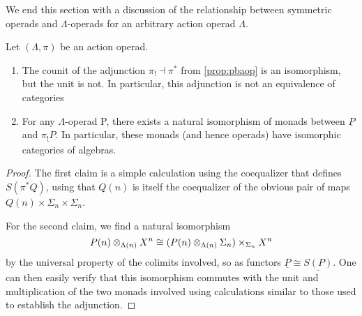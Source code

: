 We end this section with a discussion of the relationship between symmetric operads and $\Lambda$-operads for an arbitrary action operad $\Lambda$.

\begin{thm}\label{thm_sym}
Let $(\Lambda, \pi)$ be an action operad.
\begin{enumerate}
\item The counit of the adjunction $\pi_{!} \dashv \pi^*$ from \cref{prop:pbaop} is an isomorphism, but the unit is not. In particular, this adjunction is not an equivalence of categories
\item For any $\Lambda$-operad P, there exists a natural isomorphism of monads between $\underline{P}$ and $\underline{\pi_{!}P}$. In particular, these monads (and hence operads) have isomorphic categories of algebras.
\end{enumerate}
\end{thm}
\begin{proof}
The first claim is a simple calculation using the coequalizer that defines $S(\pi^{*}Q)$, using that $Q(n)$ is itself the coequalizer of the obvious pair of maps $Q(n) \times \Sigma_{n} \times \Sigma_{n}$.

For the second claim, we find a natural isomorphism
  \[
    P(n) \otimes_{\Lambda(n)} X^{n} \cong (P(n) \otimes_{\Lambda(n)} \Sigma_{n}) \times_{\Sigma_{n}} X^{n}
  \]
by the universal property of the colimits involved, so as functors $\underline{P} \cong \underline{S(P)}$. One can then easily verify that this isomorphism commutes with the unit and multiplication of the two monads involved using calculations similar to those used to establish the adjunction.
\end{proof}

%

